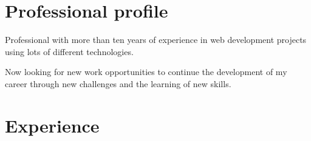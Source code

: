 \documentclass[letterpaper]{twentysecondcv} %
\begin{document}
\makeprofile %

\section{Professional profile}
Professional with more than ten years of experience in web development projects
using lots of different technologies.

Now looking for new work opportunities to continue the development of my career
through new challenges and the learning of new skills.

\section{Experience}
\end{document}
